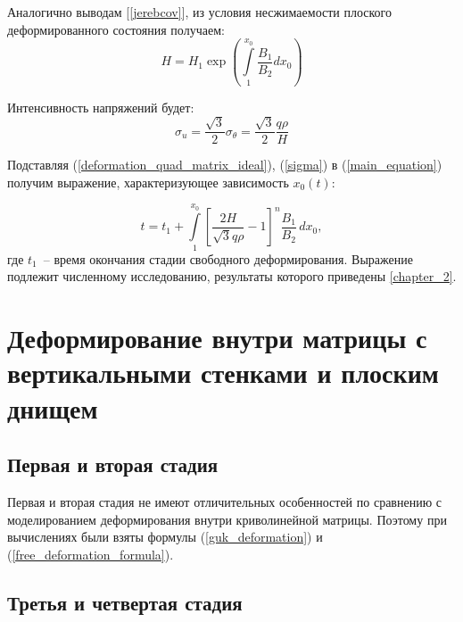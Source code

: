  Аналогично выводам [\ref{jerebcov}], из условия несжимаемости плоского деформированного состояния получаем:
 \begin{equation}
 H=H_1\exp\left(\int\limits_1^{x_0}\dfrac{B_1}{B_2}dx_0\right)
  \label{quad_matrix_h}
 \end{equation}
 
 Интенсивность напряжений будет:
 \begin{equation}
 \sigma_u = \dfrac{\sqrt 3}{2}\sigma_\theta = \dfrac{\sqrt 3}{2}\dfrac{q\rho}{H}
 \label{sigma}
 \end{equation}
 
 Подставляя (\ref{deformation_quad_matrix_ideal}), (\ref{sigma}) в (\ref{main_equation}) получим выражение, характеризующее зависимость $x_0(t)$:
 
 \begin{equation}
   t = t_1 + \int\limits^{x_0}_1 \left[ \dfrac{2H}{\sqrt3 q \rho} -1\right]^n\dfrac{B_1}{B_2}\,dx_0,
   \end{equation}
где $t_1$~-- время окончания стадии свободного деформирования.   
Выражение подлежит численному исследованию, результаты которого приведены \ref{chapter_2}.

\section{Деформирование внутри матрицы с вертикальными стенками и плоским днищем}
	\subsection{Первая и вторая стадия}
		Первая и вторая стадия не имеют отличительных особенностей по сравнению 
		с моделированием деформирования внутри криволинейной матрицы. Поэтому 
		при вычислениях были взяты формулы (\ref{guk_deformation}) и (\ref{free_deformation_formula}).
	\subsection{Третья и четвертая стадия}
	

